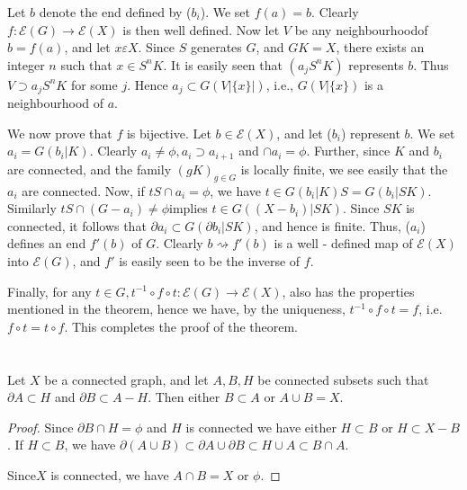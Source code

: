 Let $b$ denote the end defined by ($b_i$). We set $f(a) = b$. Clearly $f
:\mathscr{E}(G) \to \mathscr{E}(X)$ is then well defined. Now let
$V$ be any neighbourhood\pageoriginale of $b = f(a)$, and let $ x \varepsilon
X$. Since $S$ generates $G$, and $GK = X$, there exists an integer $n$
such that $x \in S^n K $. It is easily seen that $ (a_j S^n K)$
represents $b$. Thus $V \supset a_j S^n K$ for some $j$. Hence $a_j
\subset G(V |\{ x\}|)$, i.e., $G(V| \{ x\})$ is a neighbourhood of $a$.  

We now prove that $f$ is bijective. Let $b \in \mathscr{E}(X)$, and
let ($ b_i$) represent $b$. We set $a_i =  G(b_i| K)$. Clearly $a_i
\neq \phi, a_i \supset a_{i+1}$ and $\cap a_i = \phi $. Further, since $K$
and $b_i$ are connected, and the family $(gK)_{g \in G}$ is locally
finite, we see easily that the $a_i$ are connected. Now, if $tS \cap
a_i =\phi $, we have $t \in G (b_i | K)S = G( b_i| SK)$. Similarly $tS
\cap (G-a_i)\neq \phi $implies $ t \in G ((X - b_i)| SK)$. Since $SK$
is connected, it follows that $\partial a_i \subset G(\partial b_i| SK)
$, and hence is finite. Thus, ($a_i$) defines an end $f' (b)$ of
$G$. Clearly $b \rightsquigarrow f' (b)$ is a well - defined map of
$\mathscr{E}(X)$ into $\mathscr{E}(G)$, and $f'$ is easily seen to
be the inverse of $f$.  

Finally, for any $t \in G, t^{-1} \circ f \circ t : \mathscr{E}(G) \to
\mathscr{E}(X)$, also has the properties mentioned in the theorem,
hence we have, by the uniqueness, $t^{-1} \circ f \circ t = f$, i.e. $ f \circ t =
t \circ f$. This completes the proof of the theorem.  

\section{} %

\setcounter{lem}{0}
\begin{lem}\label{chap5:lem1}%
  Let $X$ be a connected graph, and let $A, B, H$ be connected subsets
  such that $\partial A \subset H$ and $\partial B \subset A - H$. Then
  either $B \subset A$ or $A \cup B = X$. 
\end{lem}

\begin{proof}
  Since $\partial B \cap H = \phi $ and $H$ is connected we have either
  $H \subset B$ or $H \subset X-B$. If $H \subset B$, we have $\partial
  (A \cup B) \subset \partial A \cup \partial B \subset H \cup A \subset
  B \cap A$.  
  
Since\pageoriginale $X$ is connected, we have $A \cap B = X$ or $\phi$. 
\end{proof}

